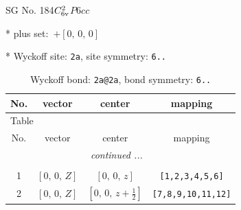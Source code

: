 \documentclass[fleqn,8pt]{jsarticle}
\begin{document}
\setcounter{MaxMatrixCols}{32}

\renewcommand{\tablename}{Table~}
\renewcommand{\figurename}{Figure~}
\begin{center}
\LARGE
SG No. 184\quad$C_{\rm 6v}^{2}$\quad$P6cc$\quad[ hexagonal ]
\end{center}

* plus set:\,\,\,$+\left[ 0,\, 0,\, 0 \right]$


* Wyckoff site: {\tt 2a}, site symmetry: {\tt 6..}
\renewcommand{\arraystretch}{1.2}
\begin{longtable}{cccc}
\caption{Wyckoff bond: {\tt 2a@2a}, bond symmetry: {\tt 6..}}
 \\
 \hline \hline
No. & vector & center & mapping \\ \hline \endfirsthead

\multicolumn{3}{l}{\tablename\ \thetable{}} \\
 \hline \hline
No. & vector & center & mapping \\ \hline \endhead

 \hline \hline
\multicolumn{3}{r}{\footnotesize\it continued ...} \\ \endfoot

 \hline \hline
\multicolumn{3}{r}{} \\ \endlastfoot

1 & $\left[ 0,\, 0,\, Z \right]$ & $\left[ 0,\, 0,\, z \right]$ & {\tt [1,2,3,4,5,6]} \\ \hline
2 & $\left[ 0,\, 0,\, Z \right]$ & $\left[ 0,\, 0,\, z + \frac{1}{2} \right]$ & {\tt [7,8,9,10,11,12]} \\
\end{longtable}
\renewcommand{\arraystretch}{1.2}
\end{document}
